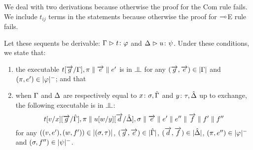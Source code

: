 
We deal with two derivations because otherwise the proof for the
Com rule fails.
We include $t_{ij}$ terms in the statements because otherwise
the proof for $\multimap$E rule fails.

\begin{proposition}[Adequacy]
 Let these sequents be derivable:
$  {\Gamma}\vartriangleright{ {t} \colon{\varphi} } $
   and
$  {\Delta}\vartriangleright{ {u} \colon{\psi} }$\enspace.
 Under these conditions, we state that:
 \begin{enumerate}[label=(\arabic{*}), ref=\textit{(\arabic{*})}]
  \item \label{c:first} the executable
	$
	t[\overrightarrow{g}/\Gamma], \pi\parallel \overrightarrow{e}\parallel e'
	$
	is in $\bbot$
	 for any
	$(\overrightarrow{g},\overrightarrow{e})\in|{\Gamma}|$ and $(\pi, e')\in|{\varphi}|^-$; and that
  \item \label{c:second}
	when $\Gamma$ and $\Delta$ are respectively
	equal to ${x} \colon{\sigma}, \hat{\Gamma}$ and ${y} \colon{\tau}, \hat{\Delta}$ up to exchange,
	the following executable is in $\bbot$:
	\[
	t[v/x][\overrightarrow g/\hat {\Gamma}],\pi    \parallel
	u[w/y][\overrightarrow d/\hat {\Delta}],\sigma \parallel
	\overrightarrow e \parallel e' \parallel e'' \parallel \overrightarrow f\parallel f'\parallel f''
	\]
	for any
	$((v,e'),(w,f'))\in|{(\sigma,\tau)}|$,
	$(\overrightarrow g,\overrightarrow e)\in|{\hat{\Gamma}}|$,
	$(\overrightarrow d,\overrightarrow f)\in|{\hat{\Delta}}|$,
	$(\pi,e'')      \in|{\varphi}|^-$ and
	$(\sigma,f'')   \in|{\psi}|^-$.
  \end{enumerate}
 \end{proposition}
